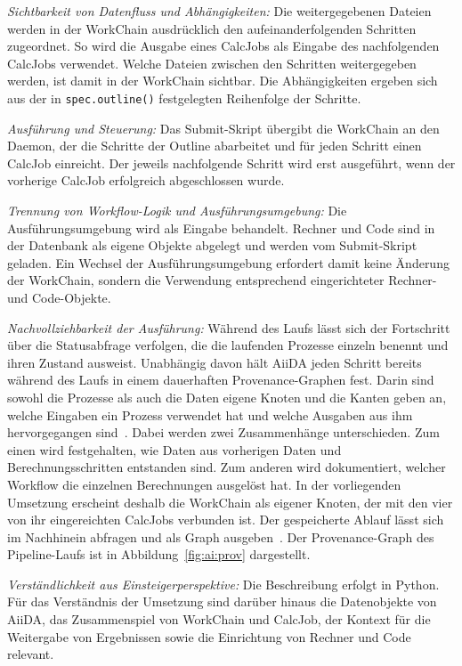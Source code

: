 \emph{Sichtbarkeit von Datenfluss und Abhängigkeiten:} Die
weitergegebenen Dateien werden in der WorkChain ausdrücklich den
aufeinanderfolgenden Schritten zugeordnet. So wird die Ausgabe eines
CalcJobs als Eingabe des nachfolgenden CalcJobs verwendet. Welche
Dateien zwischen den Schritten weitergegeben werden, ist damit in der
WorkChain sichtbar. Die Abhängigkeiten ergeben sich aus der
in \texttt{spec.outline()} festgelegten Reihenfolge der Schritte.

\emph{Ausführung und Steuerung:} Das Submit-Skript übergibt die
WorkChain an den Daemon, der die Schritte der Outline abarbeitet und
für jeden Schritt einen CalcJob einreicht. Der jeweils nachfolgende
Schritt wird erst ausgeführt, wenn der vorherige CalcJob erfolgreich
abgeschlossen wurde.

\emph{Trennung von Workflow-Logik und Ausführungsumgebung:} Die
Ausführungsumgebung wird als Eingabe behandelt. Rechner und Code sind
in der Datenbank als eigene Objekte abgelegt und werden vom
Submit-Skript geladen. Ein Wechsel der Ausführungsumgebung erfordert
damit keine Änderung der WorkChain, sondern die Verwendung
entsprechend eingerichteter Rechner- und Code-Objekte.


\emph{Nachvollziehbarkeit der Ausführung:} Während des Laufs lässt
sich der Fortschritt über die Statusabfrage verfolgen, die die
laufenden Prozesse einzeln benennt und ihren Zustand ausweist. Unabhängig davon hält AiiDA jeden Schritt bereits während des Laufs in einem dauerhaften
Provenance-Graphen fest. Darin sind sowohl die Prozesse als auch die
Daten eigene Knoten und die Kanten geben an, welche Eingaben ein
Prozess verwendet hat und welche Ausgaben aus ihm hervorgegangen
sind~\cite[S.~7\,f.]{huber2020aiida}. Dabei werden zwei Zusammenhänge unterschieden. Zum einen wird festgehalten, wie Daten aus vorherigen Daten und Berechnungsschritten entstanden sind. Zum anderen wird dokumentiert, welcher Workflow die einzelnen Berechnungen ausgelöst hat. In der vorliegenden Umsetzung erscheint deshalb die WorkChain als
eigener Knoten, der mit den vier von ihr eingereichten CalcJobs
verbunden ist. Der gespeicherte Ablauf lässt sich im
Nachhinein abfragen und als Graph ausgeben~\cite{aiidadocs-graph}. Der
Provenance-Graph des Pipeline-Laufs ist in
Abbildung~\ref{fig:ai:prov} dargestellt.

\emph{Verständlichkeit aus Einsteigerperspektive:} Die Beschreibung
erfolgt in Python. Für das Verständnis der Umsetzung sind darüber hinaus die
Datenobjekte von AiiDA, das Zusammenspiel von WorkChain und CalcJob,
der Kontext für die Weitergabe von Ergebnissen sowie die Einrichtung
von Rechner und Code relevant.

